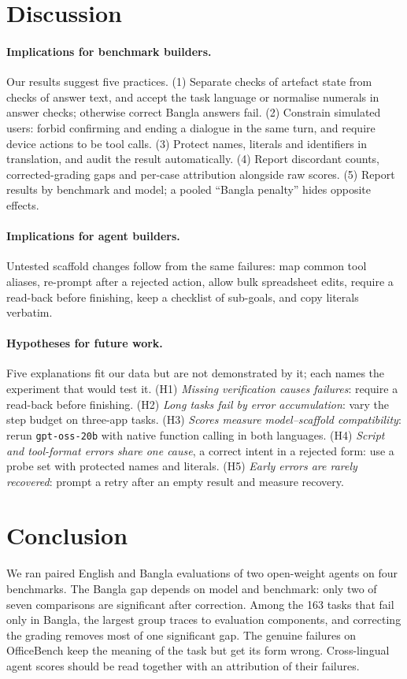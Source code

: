 \documentclass[11pt]{article}
\newcommand{\gptoss}{\texttt{gpt-oss-20b}}
\newcommand{\OB}{OfficeBench}
\begin{document}
\section{Discussion}
\label{sec:discussion}

\paragraph{Implications for benchmark builders.} Our results suggest five practices.
(1) Separate checks of artefact state from checks of answer text, and accept the task language
or normalise numerals in answer checks; otherwise correct Bangla answers fail. (2) Constrain
simulated users: forbid confirming and ending a dialogue in the same turn, and require device
actions to be tool calls. (3) Protect names, literals and identifiers in translation, and audit
the result automatically. (4) Report discordant counts, corrected-grading gaps and per-case
attribution alongside raw scores. (5) Report results by benchmark and model; a pooled ``Bangla
penalty'' hides opposite effects.

\paragraph{Implications for agent builders.} Untested scaffold changes follow from the same
failures: map common tool aliases, re-prompt after a rejected action, allow bulk spreadsheet edits,
require a read-back before finishing, keep a checklist of sub-goals, and copy literals verbatim.

\paragraph{Hypotheses for future work.} Five explanations fit our data but are not demonstrated
by it; each names the experiment that would test it. (H1) \emph{Missing verification causes
failures}: require a read-back before finishing. (H2) \emph{Long tasks fail by error
accumulation}: vary the step budget on three-app tasks. (H3) \emph{Scores measure model--scaffold
compatibility}: rerun \gptoss{} with native function calling in both languages. (H4) \emph{Script
and tool-format errors share one cause}, a correct intent in a rejected form: use a probe set with
protected names and literals. (H5) \emph{Early errors are rarely recovered}: prompt a retry after an
empty result and measure recovery.

\section{Conclusion}
We ran paired English and Bangla evaluations of two open-weight agents on four benchmarks. The
Bangla gap depends on model and benchmark: only two of seven comparisons are significant after
correction. Among the 163 tasks that fail only in Bangla, the largest group traces to evaluation
components, and correcting the grading removes most of one significant gap. The genuine failures
on \OB{} keep the meaning of the task but get its form wrong. Cross-lingual agent scores should be
read together with an attribution of their failures.
\end{document}
